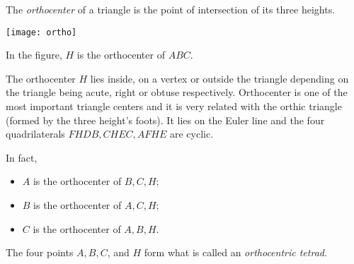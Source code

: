 \documentclass[12pt]{article}
\begin{document}
The \emph{orthocenter} of a triangle is the point of intersection of its three heights.

\begin{center}\texttt{[image: ortho]}
\end{center}

In the figure, $H$ is the orthocenter of $ABC$. 

The orthocenter $H$ lies inside, on a vertex or outside the triangle depending on the triangle being acute, right or obtuse respectively. Orthocenter is one of the most important triangle centers and it is very related with the orthic triangle (formed by the three height's foots). It lies on the Euler line and the four quadrilaterals $FHDB, CHEC, AFHE$ are cyclic.

In fact,

\begin{itemize}
\item $A$ is the orthocenter of $B, C, H$;
\item $B$ is the orthocenter of $A, C, H$;
\item $C$ is the orthocenter of $A, B, H$.
\end{itemize}


The four points $A, B, C$, and $H$ form what is  called
 an \emph{orthocentric tetrad}.
\end{document}
